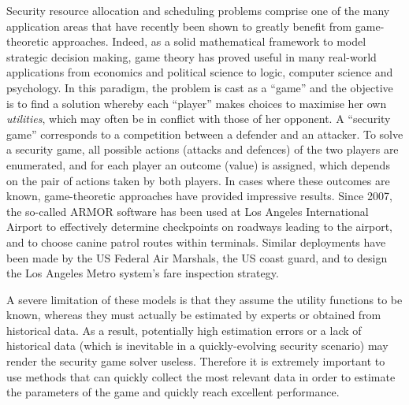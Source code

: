 Security resource allocation and scheduling problems comprise one of the many application areas that have recently been shown to greatly benefit from game-theoretic approaches. Indeed, as a solid mathematical framework to model strategic decision making, game theory has proved useful in many real-world applications from economics and political science to logic, computer science and psychology. In this paradigm, the problem is cast as a ``game'' and the objective is to find a solution whereby each ``player'' makes choices to maximise her own \textit{utilities}, which may often be in conflict with those of her opponent. A ``security game'' corresponds to a competition between a defender and an attacker. To solve a security game, all possible actions (attacks and defences) of the two players are enumerated, and for each player an outcome (value) is assigned, which depends on the pair of actions taken by both players. In cases where these outcomes are known, game-theoretic approaches have provided impressive results. Since 2007, the so-called ARMOR software \cite{pita2008deployed} has been used at Los Angeles International Airport to effectively determine checkpoints on roadways leading to the airport, and to choose canine patrol routes within terminals. Similar deployments have been made by the US Federal Air Marshals, the US coast guard, and to design the Los Angeles Metro system's fare inspection strategy\cite{tsai2009iris,shieh2012protect,yin2012trusts}. 

A severe limitation of these models is that they assume the utility functions to be known, whereas they must actually be estimated by experts or obtained from historical data. As a result, potentially high estimation errors or a lack of historical data (which is inevitable in a quickly-evolving security scenario) may render the security game solver useless. 
Therefore it is extremely important to use methods that can quickly collect the most relevant data  in order to estimate the parameters of the game and quickly reach excellent performance.

